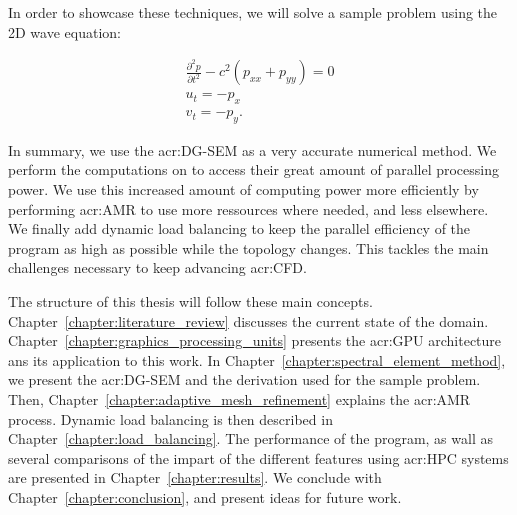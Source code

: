 In order to showcase these techniques, we will solve a sample problem using the 2D wave equation:

\begin{gather}
	\frac{\partial^2p}{\partial t^2} - c^2(p_{xx} + p_{yy}) = 0 \\
	u_t = - p_x \\
	v_t = -p_y.
\end{gather}

In summary, we use the \acrlong{acr:DG-SEM} as a very accurate numerical method. We perform the
computations on  to access their great amount of parallel processing power. We
use this increased amount of computing power more efficiently by performing \acrlong{acr:AMR} to use
more ressources where needed, and less elsewhere. We finally add dynamic load balancing to keep the
parallel efficiency of the program as high as possible while the topology changes. This tackles the
main challenges necessary to keep advancing \acrshort{acr:CFD}.

The structure of this thesis will follow these main concepts.
Chapter~\ref{chapter:literature_review} discusses the current state of the domain.
Chapter~\ref{chapter:graphics_processing_units} presents the \acrshort{acr:GPU} architecture ans its
application to this work. In Chapter~\ref{chapter:spectral_element_method}, we present the
\acrshort{acr:DG-SEM} and the derivation used for the sample problem. Then,
Chapter~\ref{chapter:adaptive_mesh_refinement} explains the \acrshort{acr:AMR} process. Dynamic load
balancing is then described in Chapter~\ref{chapter:load_balancing}. The performance of the program,
as wall as several comparisons of the impart of the different features using \acrshort{acr:HPC}
systems are presented in Chapter~\ref{chapter:results}. We conclude with
Chapter~\ref{chapter:conclusion}, and present ideas for future work.
